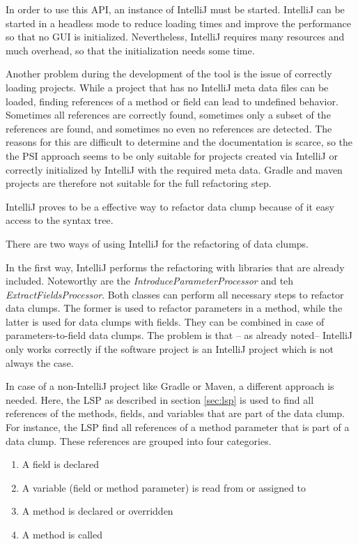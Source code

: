 In order to use this API, an instance of IntelliJ must be started. IntelliJ can be started in a headless mode to reduce loading times and improve the performance so that no GUI is initialized. Nevertheless, IntelliJ requires many resources and much overhead, so that  the initialization needs some time.

Another problem during the development of the tool is the issue of correctly loading projects. While a project that has no IntelliJ meta data files can be loaded, finding references of a method or field can lead to undefined behavior. Sometimes all references are correctly found, sometimes only a subset of the references are found, and sometimes no even no references are detected. The reasons for this are difficult to determine and the documentation is scarce, so the the PSI approach seems to be only suitable for projects created via IntelliJ or correctly initialized by IntelliJ with the required meta data. Gradle and maven projects are therefore not suitable for the full refactoring step. 


IntelliJ proves to be a effective way to refactor data clump because of it easy access to the syntax tree.

There are two ways of using IntelliJ for the refactoring of data clumps.

In the first way, IntelliJ performs the refactoring with libraries that are already included. Noteworthy are the \textit{IntroduceParameterProcessor} and teh \textit{ExtractFieldsProcessor}. Both classes can perform all necessary steps to refactor data clumps. The former is used to refactor parameters in a method, while the latter is used for data clumps with fields. They can be combined in case of parameters-to-field data clumps. The problem is that -- as already noted-- IntelliJ only works correctly if the software project is an IntelliJ project which is not always the case.

In case of a non-IntelliJ project like Gradle or Maven, a different approach is needed. Here, the \ac{LSP} as described in section \ref{sec:lsp} is used to find all references of the methods, fields, and variables that are part of the data clump. For instance, the \ac{LSP} find all references of a method parameter that is part of a data clump. These references are grouped into four categories. 
\begin{enumerate}
     \item A field is declared
    \item A variable (field or method parameter) is read from or assigned to
   
    \item A method is declared or overridden
    \item A method is called
\end{enumerate}

